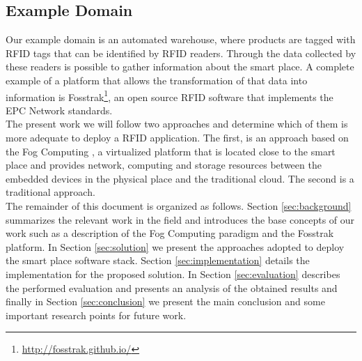 \subsection{Example Domain}
\label{sub:domain}
Our example domain is an automated warehouse, where products are tagged with \gls{RFID} tags that
can be identified by \gls{RFID} readers. Through the data collected by these readers is possible to
gather information about the smart place. A complete example of a platform that allows the transformation
of that data into information is Fosstrak\footnote{\url{http://fosstrak.github.io/}}, an open
source \gls{RFID} software that implements the \gls{EPC} Network standards.\\

The present work we will follow two approaches and determine which of them is more adequate to
deploy a \gls{RFID} application. The first, is an approach based on the Fog Computing \cite{bonomi2012fog},
a virtualized platform that is located close to the smart place and provides network, computing and storage
resources between the embedded devices in the physical place and the traditional cloud. The second is
a traditional approach.\\

The remainder of this document is organized as follows. Section \ref{sec:background} summarizes the
relevant work in the field and introduces the base concepts of our work such as a description of the
Fog Computing paradigm and the Fosstrak platform. In Section \ref{sec:solution} we present the approaches
adopted to deploy the smart place software stack. Section \ref{sec:implementation} details the
implementation for the proposed solution. In Section \ref{sec:evaluation} describes the performed
evaluation and presents an analysis of the obtained results and finally in Section \ref{sec:conclusion}
we present the main conclusion and some important research points for future work.
